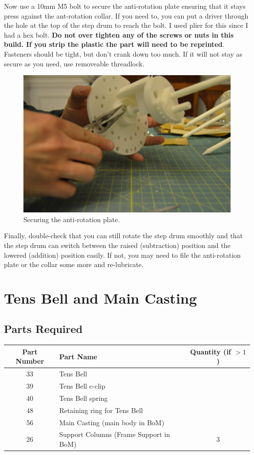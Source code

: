 \documentclass[openany]{book}
\begin{document}
Now use a 10mm M5 bolt to secure the anti-rotation plate ensuring that it stays press against the
ant-rotation collar. If you need to, you can put a driver through the hole at the top of the step
drum to reach the bolt. I used plier for this since I had a hex bolt. \textbf{Do not over tighten
any of the screws or nuts in this build. If you strip the plastic the part will need to be reprinted}.
Fasteners should be tight, but don't crank down too much. If it will not stay as secure as you need,
use removeable threadlock.

\begin{figure}[!ht]
	\centering
	\includegraphics[width=.75\textwidth]{images/image28.jpg}
	\caption{Securing the anti-rotation plate.}
	\label{fig:image28}	
\end{figure}

Finally, double-check that you can still rotate the step drum smoothly and that the step drum can
switch between the raised (subtraction) position and the lowered (addition) position easily. If not,
you may need to file the anti-rotation plate or the collar some more and re-lubricate.



%

\chapter{Tens Bell and Main Casting}

\section{Parts Required}
\begin{table}[!ht]
	\centering
	\begin{tabular}{clc}
		Part Number & Part Name & Quantity (if $>1$) \\ \hline
		33 & Tens Bell & \\
		39 & Tens Bell c-clip & \\
		40 & Tens Bell spring & \\
		48 & Retaining ring for Tens Bell & \\
		56 & Main Casting (main body in BoM) & \\
		26 & Support Columns (Frame Support in BoM) & 3 
	\end{tabular}
\end{table}
\end{document}
